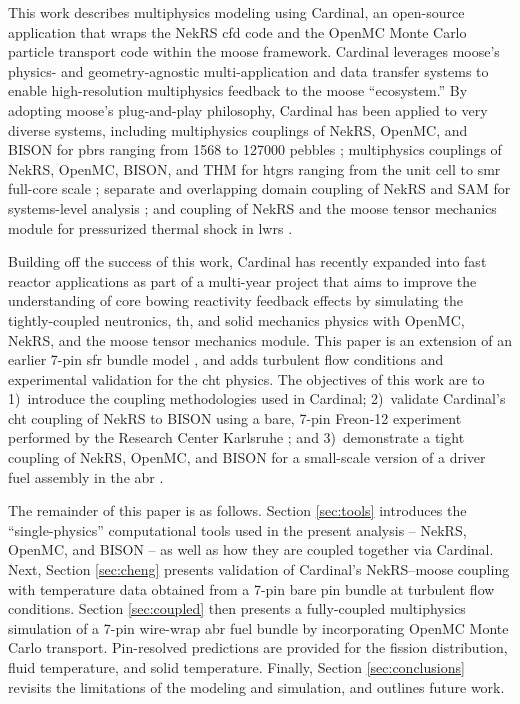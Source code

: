 \documentclass[3p,,preprint,11pt]{elsarticle}
\begin{document}
This work describes multiphysics modeling using Cardinal, an open-source application that wraps the NekRS \gls{cfd} code \cite{nekrs} and the OpenMC Monte Carlo particle transport code \cite{openmc} within the \gls{moose} framework. Cardinal leverages \gls{moose}'s physics- and geometry-agnostic multi-application and data transfer systems to enable high-resolution multiphysics feedback to the \gls{moose} ``ecosystem.'' By adopting \gls{moose}'s plug-and-play philosophy, Cardinal has been applied to very diverse systems, including multiphysics couplings of NekRS, OpenMC, and BISON for \glspl{pbr} ranging from 1568 to 127000 pebbles \cite{merzari2021,fischer_2021}; multiphysics couplings of NekRS, OpenMC, BISON, and THM for \glspl{htgr} ranging from the unit cell to \gls{smr} full-core scale \cite{novak2022_cardinal}; separate and overlapping domain coupling of NekRS and SAM for systems-level analysis \cite{huxford}; and coupling of NekRS and the \gls{moose} tensor mechanics module for pressurized thermal shock in \glspl{lwr} \cite{yu_2022}.

Building off the success of this work, Cardinal has recently expanded into fast reactor applications as part of a multi-year project that aims to improve the understanding of core bowing reactivity feedback effects by simulating the tightly-coupled neutronics, \gls{th}, and solid mechanics physics with OpenMC, NekRS, and the \gls{moose} tensor mechanics module. This paper is an extension of an earlier 7-pin \gls{sfr} bundle model \cite{novak_2021}, and adds turbulent flow conditions and experimental validation for the \gls{cht} physics. The objectives of this work are to 1)~introduce the coupling methodologies used in Cardinal; 2)~validate Cardinal's \gls{cht} coupling of NekRS to BISON using a bare, 7-pin Freon-12 experiment performed by the Research Center Karlsruhe \cite{cheng2009}; and 3)~demonstrate a tight coupling of NekRS, OpenMC, and BISON for a small-scale version of a driver fuel assembly in the \gls{abr} \cite{abr}. 

The remainder of this paper is as follows. Section \ref{sec:tools} introduces the ``single-physics'' computational tools used in the present analysis -- NekRS, OpenMC, and BISON -- as well as how they are coupled together via Cardinal. Next, Section \ref{sec:cheng} presents validation of Cardinal's NekRS--\gls{moose} coupling with temperature data obtained from a 7-pin bare pin bundle at turbulent flow conditions. Section \ref{sec:coupled} then presents a fully-coupled multiphysics simulation of a 7-pin wire-wrap \gls{abr} fuel bundle by incorporating OpenMC Monte Carlo transport. Pin-resolved predictions are provided for the fission distribution, fluid temperature, and solid temperature. %
Finally, Section \ref{sec:conclusions} revisits the limitations of the modeling and simulation, and outlines future work.
\end{document}
